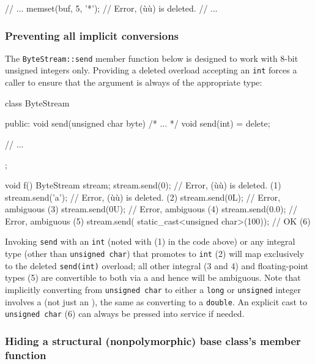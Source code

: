 \begin{emcppslisting}
// ...
memset(buf, 5, '*');  // Error, (ù{}ù) is deleted.
// ...
\end{emcppslisting}


\subsubsection[Preventing all implicit conversions]{Preventing all implicit conversions}\label{preventing-all-implicit-conversions}

The \lstinline!ByteStream::send! member function below is designed to work
with 8-bit unsigned integers only. Providing a deleted overload
accepting an \lstinline!int! forces a caller to ensure that the argument is
always of the appropriate type:

\begin{emcppslisting}
class ByteStream
{
public:
    void send(unsigned char byte) { /* ... */ }
    void send(int) = delete;

    // ...
};

void f()
{
    ByteStream stream;
    stream.send(0);   // Error, (ù{}ù) is deleted.     (1)
    stream.send('a'); // Error, (ù{}ù) is deleted.     (2)
    stream.send(0L);  // Error, ambiguous                 (3)
    stream.send(0U);  // Error, ambiguous                 (4)
    stream.send(0.0); // Error, ambiguous                 (5)
    stream.send(
        static_cast<unsigned char>(100));  // OK          (6)
}
\end{emcppslisting}

\noindent Invoking \lstinline!send! with an \lstinline!int! (noted with (1) in the code above) or any integral type
(other than \lstinline!unsigned!~\lstinline!char!) that promotes to \lstinline!int! (2)
will map exclusively to the deleted \lstinline!send(int)! overload; all
other integral (3 and 4) and floating-point types (5) are convertible to
both via a  and hence will be ambiguous. Note that
implicitly converting from \lstinline!unsigned!~\lstinline!char! to either a
\lstinline!long! or \lstinline!unsigned! integer involves a  (not just an ), the same as
  converting to a \lstinline!double!.
An explicit cast to \lstinline!unsigned!~\lstinline!char! (6) can always be
pressed into service if needed.

\subsubsection[Hiding a structural (nonpolymorphic) base class's member function]{Hiding a structural (nonpolymorphic) base class’s member function}\label{hiding-a-structural-(nonpolymorphic)-base-class's-member-function}

